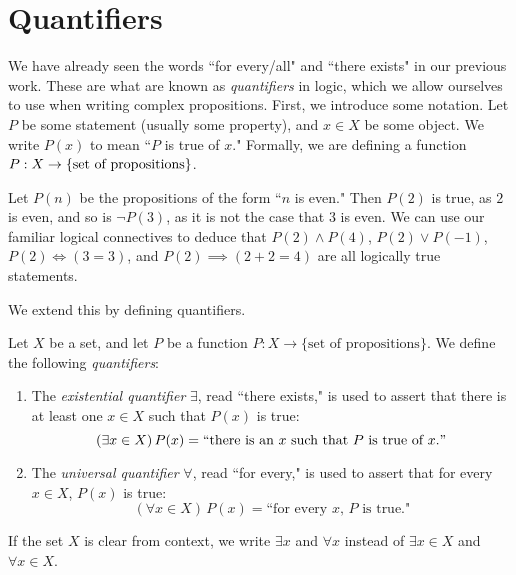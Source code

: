 \documentclass{article}
\begin{document}
\section{Quantifiers}
We have already seen the words ``for every/all" and ``there exists" in our previous work. These are what are known as \textit{quantifiers} in logic, which we allow ourselves to use when writing complex propositions. First, we introduce some notation. Let $P$ be some statement (usually some property), and $x\in X$ be some object. We write $P(x)$ to mean ``$P$ is true of $x$." Formally, we are defining a function $P: X\to \left\{\text{set of propositions}\right\}$.
\begin{example}
Let $P(n)$ be the propositions of the form ``$n$ is even." Then $P(2)$ is true, as $2$ is even, and so is $\lnot P(3)$, as it is not the case that $3$ is even. We can use our familiar logical connectives to deduce that $P(2) \land P(4)$, $P(2)\lor P(-1)$, $P(2) \iff (3 = 3)$, and $P(2) \implies (2+2=4)$ are all logically true statements.
\end{example}
We extend this by defining quantifiers.
\begin{definition}
Let $X$ be a set, and let $P$ be a function $P: X\to \{\text{set of propositions}\}$. We define the following \textit{quantifiers}:
\begin{enumerate}
    \item The \textit{existential quantifier} $\exists$, read ``there exists," is used to assert that there is at least one $x\in X$ such that $P(x)$ is true:
    $$(\exists x\in X)\, P(x) = \text{``there is an } x \text{ such that } P \text{ is true of } x."$$
    \item The \textit{universal quantifier} $\forall$, read ``for every," is used to assert that for every $x\in X$, $P(x)$ is true:
    $$(\forall x\in X)\, P(x) = \text{``for every } x,\, P \text{ is true."}$$
\end{enumerate}
If the set $X$ is clear from context, we write $\exists x$ and $\forall x$ instead of $\exists x\in X$ and $\forall x\in X$.
\end{definition}
 
\end{document}

